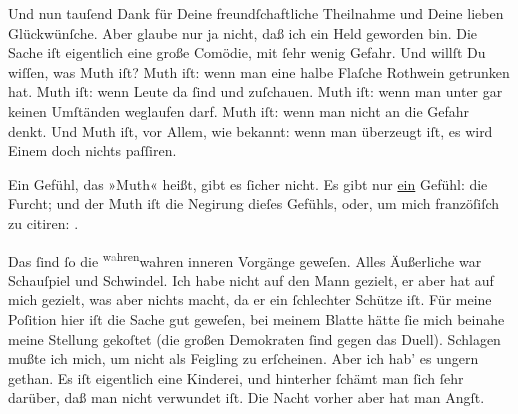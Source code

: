\pstart
           Und nun  tauſend Dank für Deine freundſchaftliche Theilnahme und Deine lieben
               Glückwünſche. Aber glaube nur  ja nicht, daß ich
               ein  Held geworden bin. Die Sache iſt eigentlich
               eine große Comödie, mit{ }ſehr wenig Gefahr. Und willſt Du {\pb}wiſſen, was Muth iſt? Muth iſt: wenn man \label{K_L02791-4v}\label{K_L02791-4} eine halbe Flaſche Rothwein
               getrunken hat. Muth iſt: wenn Leute da{ }ſind und zuſchauen. Muth iſt: wenn man unter
               gar keinen Umſtänden weglaufen darf. Muth iſt: wenn man nicht an die Gefahr denkt.
               Und Muth iſt, vor Allem, wie bekannt: wenn man überzeugt iſt, es wird Einem doch
               nichts paſſiren.\pend
           
\pstart
           Ein Gefühl, das »Muth« heißt, gibt es{ }ſicher nicht. Es gibt nur \uline{ein} Gefühl: die Furcht; und der Muth iſt die Negirung dieſes {\pb}Gefühls, oder, um mich franzöſiſch zu citiren:
                  \label{K_L02791-5v}\label{K_L02791-5}.\pend
           
\pstart
           Das{ }ſind{ }ſo die \substVorne{}\textsuperscript{w\textcolor{gray}{a}hren}\substDazwischen{}wahren\substHinten{} inneren Vorgänge geweſen. Alles Äußerliche war Schauſpiel und Schwindel. Ich
               habe nicht auf den Mann
               gezielt, er aber hat auf mich gezielt, was aber nichts macht, da  er ein{ }ſchlechter Schütze iſt. Für meine Poſition hier iſt die Sache gut
               geweſen, bei meinem Blatte
               hätte{ }ſie mich beinahe meine Stellung gekoſtet (die großen Demokraten{ }ſind gegen das
               Duell). Schlagen mußte ich mich, um nicht als {\pb}Feigling zu erſcheinen. Aber ich hab’ es ungern gethan. Es iſt eigentlich eine
               Kinderei, und hinterher{ }ſchämt man{ }ſich{ }ſehr darüber, daß man nicht verwundet iſt.
               Die Nacht vorher aber hat man Angſt.\pend
           
